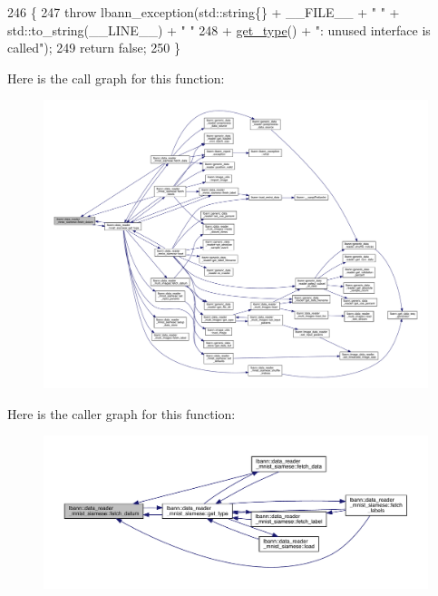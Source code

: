 \begin{DoxyCode}
246                                                                                     \{
247   \textcolor{keywordflow}{throw} lbann\_exception(std::string\{\} + \_\_FILE\_\_ + \textcolor{stringliteral}{" "} + std::to\_string(\_\_LINE\_\_) + \textcolor{stringliteral}{" "}
248                         + \hyperlink{classlbann_1_1data__reader__mnist__siamese_a2c5a29603f850bb0684dba1c64981604}{get\_type}() + \textcolor{stringliteral}{": unused interface is called"});
249   \textcolor{keywordflow}{return} \textcolor{keyword}{false};
250 \}
\end{DoxyCode}
Here is the call graph for this function\+:\nopagebreak
\begin{figure}[H]
\begin{center}
\leavevmode
\includegraphics[width=350pt]{classlbann_1_1data__reader__mnist__siamese_a299dd32be165c5acf320b6f40404cb17_cgraph}
\end{center}
\end{figure}
Here is the caller graph for this function\+:\nopagebreak
\begin{figure}[H]
\begin{center}
\leavevmode
\includegraphics[width=350pt]{classlbann_1_1data__reader__mnist__siamese_a299dd32be165c5acf320b6f40404cb17_icgraph}
\end{center}
\end{figure}
\mbox{\label{classlbann_1_1data__reader__mnist__siamese_a9124e72ab8d6913f5c90222ff0f45272}} 
